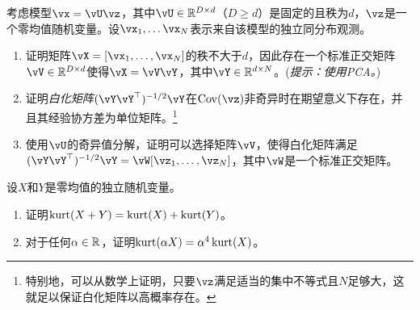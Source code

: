 \documentclass[../../book-main_zh.tex]{subfiles}
\begin{document}
\begin{exercise}\label{exercise:whitening}
    考虑模型$\vx = \vU \vz$，其中$\vU \in \R^{D \times d}$（$D \geq d$）是固定的且秩为$d$，$\vz$是一个零均值随机变量。设$\vx_1, \dots \vx_N$表示来自该模型的独立同分布观测。
    \begin{enumerate}
        \item 证明矩阵$\vX = [\vx_1, \dots, \vx_N]$的秩不大于$d$，因此存在一个标准正交矩阵$\vV \in \R^{D \times d}$使得$\vX = \vV \vY$，其中$\vY \in \R^{d \times N}$。(\textit{提示：使用PCA。})
        \item 证明\textit{白化矩阵}$(\vY \vY^\top)^{-1/2}\vY$在$\Cov(\vz)$非奇异时在期望意义下存在，并且其经验协方差为单位矩阵。\footnote{特别地，可以从数学上证明，只要$\vz$满足适当的集中不等式且$N$足够大，这就足以保证白化矩阵以高概率存在。}
        \item 使用$\vU$的奇异值分解，证明可以选择矩阵$\vV$，使得白化矩阵满足$(\vY \vY^\top)^{-1/2} \vY = \vW [\vz_1, \dots, \vz_N]$，其中$\vW$是一个标准正交矩阵。
    \end{enumerate}
\end{exercise}

\begin{exercise}\label{exercise:kurtosis-linearity-properties}
    设$X$和$Y$是零均值的独立随机变量。
    \begin{enumerate}
        \item 证明$\mathop{\mathrm{kurt}}(X + Y) = \mathop{\mathrm{kurt}}(X) + \mathop{\mathrm{kurt}}(Y)$。
        \item 对于任何$\alpha \in \mathbb{R}$，证明$\mathop{\mathrm{kurt}}(\alpha X) = \alpha^4 \mathop{\mathrm{kurt}}(X)$。
    \end{enumerate}
\end{exercise}
\end{document}
